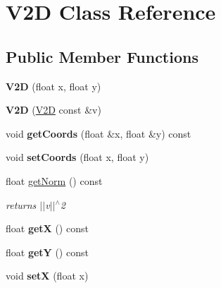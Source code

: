\hypertarget{class_v2_d}{\section{V2\-D Class Reference}
\label{class_v2_d}
}
\subsection*{Public Member Functions}
\begin{DoxyCompactItemize}
\item 
\hypertarget{class_v2_d_aa5644cab4fe9fee51c66bb044e65c46e}{{\bfseries V2\-D} (float x, float y)}\label{class_v2_d_aa5644cab4fe9fee51c66bb044e65c46e}

\item 
\hypertarget{class_v2_d_a8327cc11b505d339fd1379b9e9831b37}{{\bfseries V2\-D} (\hyperlink{class_v2_d}{V2\-D} const \&v)}\label{class_v2_d_a8327cc11b505d339fd1379b9e9831b37}

\item 
\hypertarget{class_v2_d_a15a9ab85cd256a983ebeacdf5033cfb8}{void {\bfseries get\-Coords} (float \&x, float \&y) const }\label{class_v2_d_a15a9ab85cd256a983ebeacdf5033cfb8}

\item 
\hypertarget{class_v2_d_a3a48d07cdf9828d17da52993d77f2cc7}{void {\bfseries set\-Coords} (float x, float y)}\label{class_v2_d_a3a48d07cdf9828d17da52993d77f2cc7}

\item 
\hypertarget{class_v2_d_aefe4d7bf3752796db34a38a9d3cf8a86}{float \hyperlink{class_v2_d_aefe4d7bf3752796db34a38a9d3cf8a86}{get\-Norm} () const }\label{class_v2_d_aefe4d7bf3752796db34a38a9d3cf8a86}

\begin{DoxyCompactList}\small\item\em returns $|$$|$v$|$$|$$^\wedge$2 \end{DoxyCompactList}\item 
\hypertarget{class_v2_d_af833c27bc15bf96f0eebce77bd2ec13f}{float {\bfseries get\-X} () const }\label{class_v2_d_af833c27bc15bf96f0eebce77bd2ec13f}

\item 
\hypertarget{class_v2_d_a8d77fa030907aa90f1ce8afca8a9b079}{float {\bfseries get\-Y} () const }\label{class_v2_d_a8d77fa030907aa90f1ce8afca8a9b079}

\item 
\hypertarget{class_v2_d_ae131f6f6eed9fee2d81d15d79de9638e}{void {\bfseries set\-X} (float x)}\label{class_v2_d_ae131f6f6eed9fee2d81d15d79de9638e}


\end{DoxyCompactItemize}

